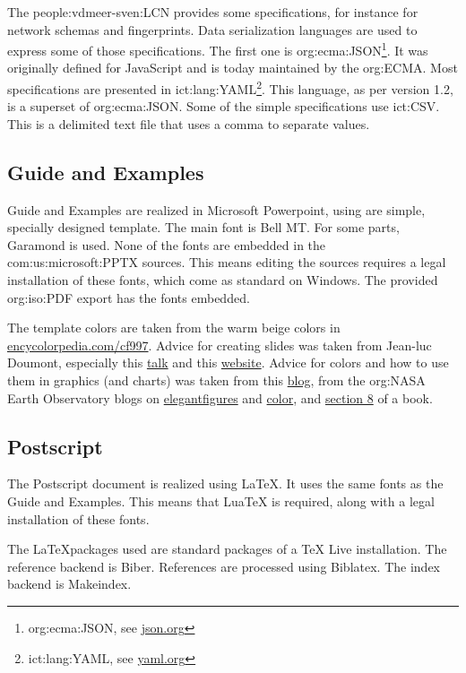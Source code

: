     The \ac{people:vdmeer-sven:LCN} provides some specifications, for instance for network schemas and fingerprints.
    Data serialization languages are used to express some of those specifications.
    The first one is \acs{org:ecma:JSON}\footnote{\ac{org:ecma:JSON}, see \href{https://www.json.org/}{json.org}}.
        It was originally defined for JavaScript and is today maintained by the \acs{org:ECMA}.
    Most specifications are presented in \acs{ict:lang:YAML}\footnote{\ac{ict:lang:YAML}, see \href{https://yaml.org/}{yaml.org}}.
        This language, as per version 1.2, is a superset of \ac{org:ecma:JSON}.
    Some of the simple specifications use \ac{ict:CSV}.
        This is a delimited text file that uses a comma to separate values.


\subsection{Guide and Examples}
    Guide and Examples are realized in Microsoft Powerpoint, using are simple, specially designed template.
    The main font is Bell MT.
    For some parts, Garamond is used.
    None of the fonts are embedded in the \acs{com:us:microsoft:PPTX} sources.
    This means editing the sources requires a legal installation of these fonts, which come as standard on Windows.
    The provided \acs{org:iso:PDF} export has the fonts embedded.

    The template colors are taken from the warm beige colors in \href{https://encycolorpedia.com/cfb997}{encycolorpedia.com/cf997}.
    Advice for creating slides was taken from Jean-luc Doumont, especially this \href{https://www.youtube.com/watch?v=meBXuTIPJQk}{talk}
        and this \href{http://www.principiae.be/X0800.php}{website}.
    Advice for colors and how to use them in graphics (and charts) was taken from
        this \href{https://medium.com/@Elijah_Meeks/color-advice-for-data-visualization-with-d3-js-33b5adc41c90}{blog},
        from the \acs{org:NASA} Earth Observatory blogs on \href{https://earthobservatory.nasa.gov/blogs/elegantfigures/}{elegantfigures} and \href{https://earthobservatory.nasa.gov/blogs/elegantfigures/category/color/}{color}, and
        \href{https://socviz.co/refineplots.html}{section 8} of a book.


\subsection{Postscript}
    The Postscript document is realized using \LaTeX.
    It uses the same fonts as the Guide and Examples.
    This means that LuaTeX is required, along with a legal installation of these fonts.

    The \LaTeX packages used are standard packages of a TeX Live installation.
    The reference backend is Biber.
    References are processed using Biblatex.
    The index backend is Makeindex.

